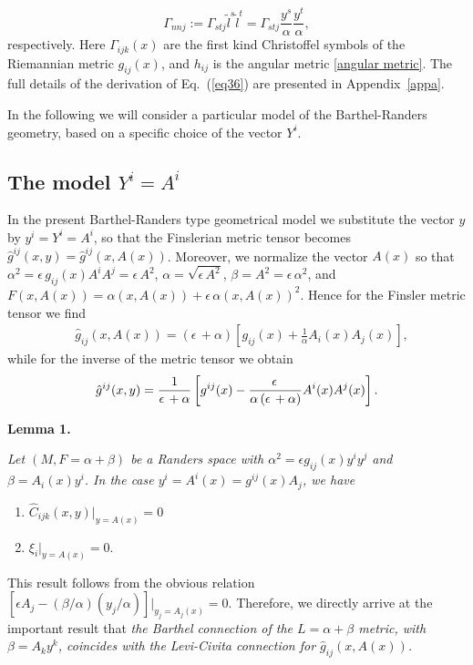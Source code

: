 \documentclass[aps,superscriptaddress, showpacs,preprintnumbers, superscriptaddress, nofootinbibt,twocolumn]{revtex4-2}
\begin{document}
\begin{equation}
{\Gamma}_{nnj}:=\Gamma _{stj}\tilde{l}^{s}\tilde{l}^{t}=\Gamma _{stj}%
\frac{y^{s}}{\alpha }\frac{y^{t}}{\alpha },
\end{equation}
respectively. Here $\Gamma_{ijk}(x)$  are the first kind Christoffel symbols of the Riemannian metric $g_{ij}(x)$, and $h_{ij}$ is the angular metric \eqref{angular metric}. The full details of the derivation of Eq.~(\ref{eq36}) are presented in Appendix~\ref{appa}.

In the following we will consider a particular model of the
Barthel-Randers geometry, based on a specific choice of the vector $Y^i$.

\subsection{The model  $Y^{i}=A^{i}$}

In the present Barthel-Randers type geometrical model we substitute the vector
$y$ by $y^{i}=Y^{i}=A^{i}$, so that the Finslerian metric tensor becomes $%
\hat{g}^{ij}(x,y)=\hat{g}^{ij}(x,A(x))$. Moreover, we normalize the vector $%
A(x)$ so that $\alpha ^{2}=\epsilon\,g_{ij}(x)A^{i}A^{j}=\epsilon\,A^{2}$, $%
\alpha =\sqrt{\epsilon\,A^{2}}$, $\beta =A^{2}=\epsilon\,\alpha ^{2}$, and $%
F\left( x,A(x)\right) =\alpha\left( x,A(x)\right) +\epsilon\,\alpha\left( x,A(x)\right) ^{2} $. Hence for the
Finsler metric tensor we find
\begin{align}
&\hat{g}_{ij}(x,A(x)) =\left( \epsilon\,+\alpha \right) \left[ g_{ij}(x)+%
\frac{1}{\alpha }A_{i}(x)A_{j}(x)\right] ,
\end{align}
while for the inverse of the metric tensor we obtain
\begin{align}
\hat{g}^{ij}(x,y)=\frac{1}{\epsilon\,+\alpha }\left[ g^{ij}(x)-\frac{%
\epsilon\,}{\alpha \left( \epsilon\,+\alpha \right) }A^{i}(x)A^{j}(x)\right]
.
\end{align}

{\bf Lemma 1.}

{\it
Let $(M,F=\alpha+\beta)$ be a Randers space with
$\alpha^2=\epsilon g_{ij}(x)y^iy^j$ and $\beta=A_i(x)y^i$. In the case $y^{i}=A^{i}(x)=g^{ij}(x)A_j$,
we have
\begin{enumerate}
    \item $\hat{C}_{ijk}(x,y)|_{y=A(x)} =0$
\item $\xi_i|_{y=A(x)}=0$.
\end{enumerate}

}
 This result follows from the obvious relation $\left[
\epsilon A_{j}-\left( \beta /\alpha \right) \left( y_{j}/\alpha \right) \right]
\left. {}\right\vert _{y_{j}=A_{j}(x)}=0$. Therefore, we directly arrive at the
important result that \textit{the Barthel connection of the $L=\alpha +\beta
$ metric, with $\beta =A_{k}y^{k}$, coincides with the Levi-Civita
connection for $\hat{g}_{ij}\left( x,A(x)\right) $.}
\end{document}
